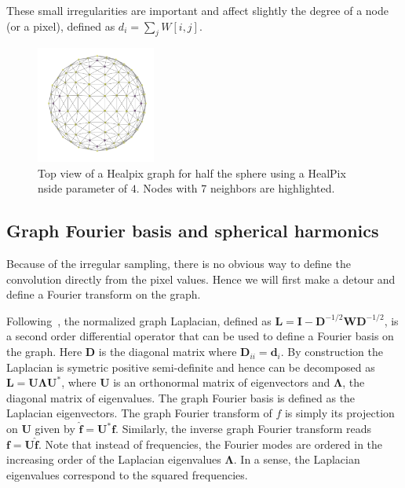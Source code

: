 \documentclass[final,twocolumn,3p,times,authoryear]{elsarticle}
\newcommand{\todo}[1]{{\color[rgb]{.6,.1,.6}{#1}}}
\renewcommand{\b}[1]{{\bm{#1}}}   %
\newcommand{\1}{\b{1}}              %
\newcommand{\0}{\b{0}}              %
\renewcommand{\L}{\b{L}} %
\newcommand{\W}{\b{W}}
\newcommand{\I}{\b{I}}
\newcommand{\D}{\b{D}}
\newcommand{\U}{\b{U}}
\newcommand{\bLambda}{\b{\Lambda}}
\begin{document}
These small irregularities are important and affect slightly the degree of a
node (or a pixel), defined as $d_i =\sum_j W[i,j]$.

\begin{figure}[!ht]
\centering
\vspace{-0.5cm}
\includegraphics[width=0.35\textwidth]{figures/half_graph_4.pdf}
\vspace{-0.5cm}
\caption{
Top view of a Healpix graph for half the sphere using a HealPix nside parameter of $4$.
Nodes with 7 neighbors are highlighted. \label{fig:healpix_graph_4}
}

\end{figure}

\subsection{Graph Fourier basis and spherical harmonics}
\todo{Add a few extra references}

Because of the irregular sampling, there is no obvious way to define the convolution
directly from the pixel values. Hence we will first make a detour and define a Fourier transform on the
graph.

Following~\cite{shuman2013emerging}, the normalized graph Laplacian,
defined as $\L = \I - \D^{-1/2} \W \D^{-1/2}$, is a second order differential operator
that can be used to define a Fourier basis on the graph. Here $\D$ is the diagonal
matrix where $\D_{ii}=\b{d}_i$. By construction the Laplacian is symetric positive
semi-definite and hence can be decomposed as $\L=\U \bLambda \U^*$, where $\U$ is an
orthonormal matrix of eigenvectors and $\bLambda$, the diagonal matrix of
eigenvalues. The graph Fourier basis is defined as the Laplacian eigenvectors.
The graph Fourier transform of $f$ is simply its projection on $\U$ given by
$\hat{\b{f}}=\U^*\b{f}$. Similarly, the inverse graph Fourier transform reads $\b{f}=\U\hat{\b{f}}$.
Note that instead of frequencies, the Fourier modes are ordered in the increasing order of the Laplacian eigenvalues $\bLambda$. In a sense, the Laplacian
eigenvalues correspond to the squared frequencies.
\end{document}
